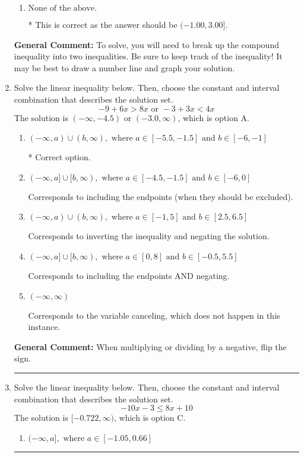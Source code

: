 \documentclass{extbook}[14pt]
\newcommand{\litem}[1]{\item #1

\rule{\textwidth}{0.4pt}}
\begin{document}
\begin{enumerate}
{\begin{enumerate}[label=\Alph*.]
$(-\infty, 1.00] \cup (-3.00, \infty)$, which corresponds to displaying the and-inequality as an or-inequality AND flipping the inequality AND getting negatives of the actual endpoints.
\item \( \text{None of the above.} \)

* This is correct as the answer should be $(-1.00, 3.00]$.
\end{enumerate}

\textbf{General Comment:} To solve, you will need to break up the compound inequality into two inequalities. Be sure to keep track of the inequality! It may be best to draw a number line and graph your solution.
}
\litem{
Solve the linear inequality below. Then, choose the constant and interval combination that describes the solution set.
\[ -9 + 6 x > 8 x \text{ or } -3 + 3 x < 4 x \]The solution is \( (-\infty, -4.5) \text{ or } (-3.0, \infty) \), which is option A.\begin{enumerate}[label=\Alph*.]
\item \( (-\infty, a) \cup (b, \infty), \text{ where } a \in [-5.5, -1.5] \text{ and } b \in [-6, -1] \)

 * Correct option.
\item \( (-\infty, a] \cup [b, \infty), \text{ where } a \in [-4.5, -1.5] \text{ and } b \in [-6, 0] \)

Corresponds to including the endpoints (when they should be excluded).
\item \( (-\infty, a) \cup (b, \infty), \text{ where } a \in [-1, 5] \text{ and } b \in [2.5, 6.5] \)

Corresponds to inverting the inequality and negating the solution.
\item \( (-\infty, a] \cup [b, \infty), \text{ where } a \in [0, 8] \text{ and } b \in [-0.5, 5.5] \)

Corresponds to including the endpoints AND negating.
\item \( (-\infty, \infty) \)

Corresponds to the variable canceling, which does not happen in this instance.
\end{enumerate}

\textbf{General Comment:} When multiplying or dividing by a negative, flip the sign.
}
\litem{
Solve the linear inequality below. Then, choose the constant and interval combination that describes the solution set.
\[ -10x -3 \leq 8x + 10 \]The solution is \( [-0.722, \infty) \), which is option C.\begin{enumerate}[label=\Alph*.]
\item \( (-\infty, a], \text{ where } a \in [-1.05, 0.66] \)


\end{enumerate}}
\end{enumerate}
\end{document}
